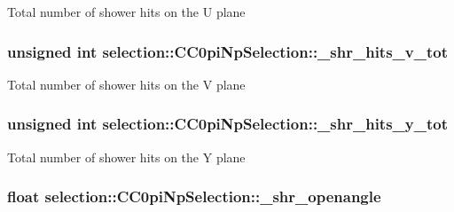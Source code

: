 Total number of shower hits on the U plane \hypertarget{classselection_1_1CC0piNpSelection_ab6aaf4282fa9d2e5971e162c66901227}{
\subsubsection[{\-\_\-shr\-\_\-hits\-\_\-v\-\_\-tot}]{\setlength{\rightskip}{0pt plus 5cm}unsigned int selection\-::\-C\-C0pi\-Np\-Selection\-::\-\_\-shr\-\_\-hits\-\_\-v\-\_\-tot\hspace{0.3cm}{\ttfamily [private]}}}\label{classselection_1_1CC0piNpSelection_ab6aaf4282fa9d2e5971e162c66901227}
Total number of shower hits on the V plane \hypertarget{classselection_1_1CC0piNpSelection_a6a43c3523af47860ad1682ebe14bb8e3}{
\subsubsection[{\-\_\-shr\-\_\-hits\-\_\-y\-\_\-tot}]{\setlength{\rightskip}{0pt plus 5cm}unsigned int selection\-::\-C\-C0pi\-Np\-Selection\-::\-\_\-shr\-\_\-hits\-\_\-y\-\_\-tot\hspace{0.3cm}{\ttfamily [private]}}}\label{classselection_1_1CC0piNpSelection_a6a43c3523af47860ad1682ebe14bb8e3}
Total number of shower hits on the Y plane \hypertarget{classselection_1_1CC0piNpSelection_a33b26acb3cdb05cb1b81800d8af48a03}{
\subsubsection[{\-\_\-shr\-\_\-openangle}]{\setlength{\rightskip}{0pt plus 5cm}float selection\-::\-C\-C0pi\-Np\-Selection\-::\-\_\-shr\-\_\-openangle\hspace{0.3cm}{\ttfamily [private]}}}\label{classselection_1_1CC0piNpSelection_a33b26acb3cdb05cb1b81800d8af48a03}
